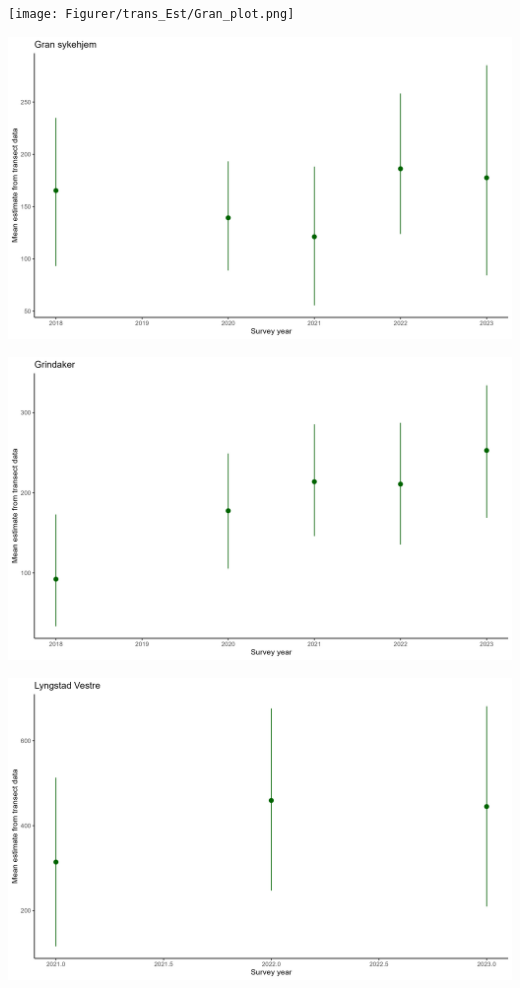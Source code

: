 \documentclass[
  letterpaper,
  DIV=11,
  numbers=noendperiod]{scrreport}
\begin{document}
\texttt{[image: Figurer/trans\_Est/Gran\_plot.png]}

\includegraphics{Figurer/trans_Est/Gran sykehjem_plot.png}

\includegraphics{Figurer/trans_Est/Grindaker_plot.png}

\includegraphics{Figurer/trans_Est/Lyngstad Vestre_plot.png}
\end{document}
